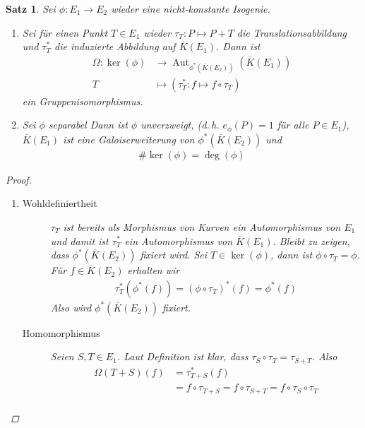 \documentclass[english, german, parskip=half]{scrartcl}
\newtheorem{Satz}{Satz}[section]
\theoremstyle{definition}
\theoremstyle{remark}
\newcommand*{\algK}{\ensuremath{\overline K}} %
\newcommand*{\longto}{\longrightarrow}
\DeclareMathOperator{\Aut}{Aut} %
\begin{document}
\begin{Satz}\label{galois}
  Sei $\phi\colon E_1\to E_2$ wieder eine nicht-konstante Isogenie.
  \begin{enumerate}[label=\roman*)]
  \item Sei für einen Punkt $T\in E_1$ wieder 
    $\tau_T\colon P\mapsto P+T$ die Translationsabbildung und 
    $\tau_T^*$ die induzierte Abbildung auf $\algK(E_1)$.
    Dann ist
    \begin{align*}
      \Omega\colon
      \ker(\phi) 
      &\longto \Aut_{\phi^*(\algK(E_2))}\left( \algK(E_1) \right) \\
      T 
      &\longmapsto \left( \tau_T^* \colon f\mapsto f\circ \tau_T \right)
    \end{align*}
    ein Gruppenisomorphismus.
  \item Sei $\phi$ separabel 
    Dann ist $\phi$ unverzweigt,
    (d.\,h. $e_\phi(P)=1$ für alle $P\in E_1$),
    $\algK(E_1)$ ist eine Galoiserweiterung von $\phi^*(\algK(E_2))$
    und
    \begin{gather*}
      \#\ker(\phi) = \deg(\phi)
    \end{gather*}
  \end{enumerate}
  \begin{proof}~
    \begin{enumerate}[label=\roman*)]
    \item 
      \begin{description}
      \item[Wohldefiniertheit] $\tau_T$ ist bereits als Morphismus
        von Kurven ein Automorphismus von $E_1$ und damit ist
        $\tau_T^*$ ein Automorphismus von $\algK(E_1)$. Bleibt zu
        zeigen, dass $\phi^*(\algK(E_2))$ fixiert wird.
        Sei $T\in\ker(\phi)$, dann ist $\phi\circ\tau_T=\phi$.
        Für $f\in\algK(E_2)$ erhalten wir
        \begin{gather*}
          \tau_T^*(\phi^*(f)) = (\phi\circ\tau_T)^*(f) = \phi^*(f)
        \end{gather*}
        Also wird $\phi^*(\algK(E_2))$ fixiert.
      \item[Homomorphismus] Seien $S,T\in E_1$. Laut Definition ist
        klar, dass $\tau_S\circ\tau_T = \tau_{S+T}$. Also
        \begin{align*}
          \Omega(T+S)(f)
          &= \tau^*_{T+S}(f)\\
          &= f\circ\tau_{T+S} 
            = f\circ\tau_{S+T}
            = f\circ\tau_{S}\circ\tau_{T}\\

\end{align*}
\end{description}
\end{enumerate}
\end{proof}
\end{Satz}
\end{document}
